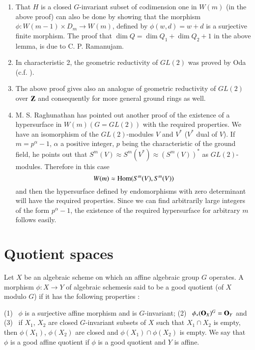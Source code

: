 \begin{remarks*}
\begin{enumerate}
\renewcommand{\labelenumi}{(\theenumi)}
\item That $H$ is a closed $G$-invariant subset of codimension one in $W(m)$ (in the above proof) can also be done by showing that the morphism $\phi:W(m-1)\times D_{m}\to W(m)$, defined by $\phi(w,d)=w+d$ is a surjective finite morphism. The proof that $\dim Q=\dim Q_{1}+\dim Q_{2}+1$ in the above lemma, is due to C. P. Ramanujam.

\item In characteristic 2, the geometric reductivity of $GL(2)$ was proved by Oda (c.f. \cite{art18-key9}).

\item The above proof gives also an analogue of geometric reductivity of $GL(2)$ over $\mathbf{Z}$ and consequently for more general ground rings as well.

\item M. S. Raghunathan has pointed out another proof of the existence of a hypersurface in $W(m)(G=GL(2))$ with the required properties. We have an isomorphism of the $GL(2)$-modules $V$ and $V^{*}$ ($V^{*}$ dual of $V$). If $m=p^{\alpha}-1$, $\alpha$ a positive integer, $p$ being the characteristic of the ground field, he points out that $S^{m}(V)\approx S^{m}(V^{*})\approx (S^{m}(V))^{*}$ as $GL(2)$-modules. Therefore in this case
$$
W(m)\approx \operatorname{\mathrm{Hom}} (S^{m}(V),S^{m}(V))
$$
and then the hypersurface defined by endomorphisms with zero determinant will have the required properties. Since we can find arbitrarily large integers of the form $p^{\alpha}-1$, the existence of the required hypersurface for arbitrary $m$ follows easily.
\end{enumerate}
\end{remarks*}

\section{Quotient spaces}\label{art18-sec2}

\begin{definition}\label{art18-defi4}
Let $X$ be an algebraic scheme on which an affine algebraic group $G$ operates. A morphism $\phi : X\to Y$ of algebraic schemes\pageoriginale is said to be a good quotient (of $X$ modulo $G$) if it has the following properties :

\noindent
{\rm(1)}~ $\phi$ is a surjective affine morphism and is $G$-invariant; {\rm(2)}~ $\phi_{*}(\mathbf{O}_{X})^{G}=\mathbf{O}_{Y}$ and 
{\rm(3)}~ if $X_{1}$, $X_{2}$ are closed $G$-invariant subsets of $X$ such that $X_{1}\cap X_{2}$ is empty, then $\phi(X_{1})$, $\phi(X_{2})$ are closed and $\phi(X_{1})\cap \phi(X_{2})$ is empty. We say that $\phi$ is a good affine quotient if $\phi$ is a good quotient and $Y$ is affine.
\end{definition}

